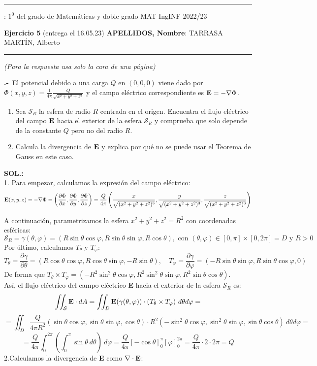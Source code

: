 \documentclass[11pt,a4paper]{article}
\date{ }
\newcounter{ex}
\newcommand{\ejer}{\stepcounter{ex}\textbf{\theex.-}\ }
\newcommand{\sen}{\sin}
\begin{document}
\hrule \vskip 1mm

:   \quad $1^0$ del grado de  Matem\'aticas y doble grado MAT-IngINF \hfill  2022/23


\vskip 1mm

{\bf Ejercicio 5} (entrega el 16.05.23) \hskip 5mm {\bf APELLIDOS, Nombre}: TARRASA MARTÍN, Alberto
\vskip 1mm \hrule

\vskip 1mm

\hfill {\footnotesize \it  (Para la respuesta usa solo la cara de una p\'agina)}

\vskip 3mm

\ejer  El potencial debido a una carga $Q$ en $(0,0,0)$ viene dado por
$\displaystyle \Phi(x,y,z)=\frac{1}{4\pi} \frac{Q}{\sqrt{x^2+y^2+z^2}}$
y el campo el\'ectrico correspondiente es ${\bold E}=-\nabla \Phi$. 
\begin{enumerate}
\item Sea $\mathcal{S}_R$ la esfera de radio $R$ centrada  en el origen. Encuentra el flujo el\'ectrico del campo  ${\bold E}$ hacia el exterior de la esfera $\mathcal{S}_R$ y comprueba que solo depende de la constante $Q$ pero no del radio $R$.
\item Calcula la divergencia de ${\bold E}$ y explica por qu\'e no se puede usar el Teorema de Gauss en este caso.
\end{enumerate}

\vskip 5mm

{\bf SOL.:}\\
1. Para empezar, calculamos la expresión del campo eléctrico:
\[
\bold E(x,y,z)=-\nabla\Phi=\left(\dfrac{\partial\Phi}{\partial x},\dfrac{\partial\Phi}{\partial y},\dfrac{\partial\Phi}{\partial z}\right)=
\dfrac{Q}{4\pi}\left(\dfrac{x}{\sqrt{(x^2+y^2+z^2)^3}}, \dfrac{y}{\sqrt{(x^2+y^2+z^2)^3}}, \dfrac{z}{\sqrt{(x^2+y^2+z^2)^3}} \right)
\]

A continuación, parametrizamos la esfera $x^2+y^2+z^2=R^2$ con coordenadas esféricas:
\[
\mathcal S_R=\gamma(\theta,\varphi)=(R\sen\theta\cos\varphi,R\sen\theta\sen\varphi,R\cos\theta), \text{ con } (\theta,\varphi)\in[0,\pi]\times[0,2\pi]=D \text{ y } R>0
\]
Por último, calculamos $T_\theta$ y $T_\varphi$:
\[
T_\theta=\dfrac{\partial\gamma}{\partial\theta}=(R\cos\theta\cos\varphi,R\cos\theta\sen\varphi,-R\sen\theta), \quad T_\varphi=\dfrac{\partial\gamma}{\partial\varphi}=(-R\sen\theta\sen\varphi,R\sen\theta\cos\varphi,0)
\]
De forma que $T_\theta \times T_\varphi = (-R^2\sen^2\theta\cos\varphi, R^2\sen^2\theta\sen\varphi, R^2\sen\theta\cos\theta)$.\\
Así, el flujo eléctrico del campo eléctrico {\bf E} hacia el exterior de la esfera $\mathcal S_R$ es:
\[\displaystyle
\iint_\mathcal{S} {\bf E}\cdot dA=\iint_D {\bf E}(\gamma(\theta,\varphi))\cdot (T_\theta\times T_\varphi)\ d\theta d\varphi=
\]
\[=\iint_D \dfrac{Q}{4\pi R^2}(\sen\theta\cos\varphi,\sen\theta\sen\varphi,\cos\theta)\cdot R^2(-\sen^2\theta\cos\varphi,\sen^2\theta\sen\varphi,\sen\theta\cos\theta)\ d\theta d\varphi=
\]
\[
=\dfrac{Q}{4\pi}\int^{2\pi}_0\left( \int^{\pi}_0\sen\theta\ d\theta\right)\ d\varphi=\dfrac{Q}{4\pi}[-\cos\theta]^{\pi}_0[\varphi]^{2\pi}_0=\dfrac{Q}{4\pi}\cdot 2\cdot 2\pi=Q
\]
2.Calculamos la divergencia de {\bf E} como $\nabla\cdot{\bf E}$:
\end{document}
